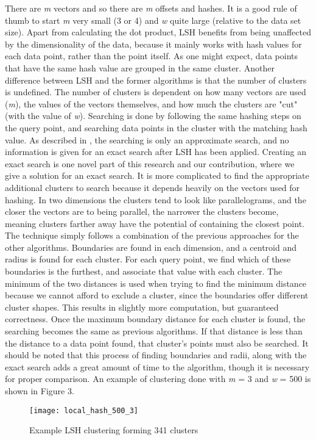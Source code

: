 \documentclass[journal]{IEEEtran}
\begin{document}
 There are \textit{m} vectors and so there are \textit{m} offsets and hashes. It is a good rule of thumb to start \textit{m} very small (3 or 4) and \textit{w} quite large (relative to the data set size). Apart from calculating the dot product, LSH benefits from being unaffected by the dimensionality of the data, because it mainly works with hash values for each data point, rather than the point itself. As one might expect, data points that have the same hash value are grouped in the same cluster. Another difference between LSH and the former algorithms is that the number of clusters is undefined. The number of clusters is dependent on how many vectors are used (\textit{m}), the values of the vectors themselves, and how much the clusters are "cut" (with the value of \textit{w}). Searching is done by following the same hashing steps on the query point, and searching data points in the cluster with the matching hash value. As described in \cite{lsh-1}, the searching is only an approximate search, and no information is given for an exact search after LSH has been applied. Creating an exact search is one novel part of this research and our contribution, where we give a solution for an exact search. It is more complicated to find the appropriate additional clusters to search because it depends heavily on the vectors used for hashing. In two dimensions the clusters tend to look like parallelograms, and the closer the vectors are to being parallel, the narrower the clusters become, meaning clusters farther away have the potential of containing the closest point. The technique simply follows a combination of the previous approaches for the other algorithms. Boundaries are found in each dimension, and a centroid and radius is found for each cluster. For each query point, we find which of these boundaries is the furthest, and associate that value with each cluster. The minimum of the two distances is used when trying to find the minimum distance because we cannot afford to exclude a cluster, since the boundaries offer different cluster shapes. This results in slightly more computation, but guaranteed correctness. Once the maximum boundary distance for each cluster is found, the searching becomes the same as previous algorithms. If that distance is less than the distance to a data point found, that cluster's points must also be searched. It should be noted that this process of finding boundaries and radii, along with the exact search adds a great amount of time to the algorithm, though it is necessary for proper comparison. An example of clustering done with \textit{m} = 3 and \textit{w} = 500 is shown in Figure 3.
\begin{figure}[h]
	\caption{Example LSH clustering forming 341 clusters}
	\texttt{[image: local\_hash\_500\_3]}
\end{figure}
\end{document}
